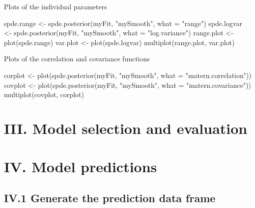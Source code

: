 \documentclass[
]{article}
\newenvironment{Shaded}{\begin{snugshade}}{\end{snugshade}}
\newcommand{\AttributeTok}[1]{\textcolor[rgb]{0.77,0.63,0.00}{#1}}
\newcommand{\FunctionTok}[1]{\textcolor[rgb]{0.00,0.00,0.00}{#1}}
\newcommand{\NormalTok}[1]{#1}
\newcommand{\OtherTok}[1]{\textcolor[rgb]{0.56,0.35,0.01}{#1}}
\newcommand{\StringTok}[1]{\textcolor[rgb]{0.31,0.60,0.02}{#1}}
\begin{document}
Plots of the individual parameters

\begin{Shaded}
\begin{Highlighting}[]
\NormalTok{spde.range }\OtherTok{\textless{}{-}} \FunctionTok{spde.posterior}\NormalTok{(myFit, }\StringTok{"mySmooth"}\NormalTok{, }\AttributeTok{what =} \StringTok{"range"}\NormalTok{)}
\NormalTok{spde.logvar }\OtherTok{\textless{}{-}} \FunctionTok{spde.posterior}\NormalTok{(myFit, }\StringTok{"mySmooth"}\NormalTok{, }\AttributeTok{what =} \StringTok{"log.variance"}\NormalTok{)}
\NormalTok{range.plot }\OtherTok{\textless{}{-}} \FunctionTok{plot}\NormalTok{(spde.range)}
\NormalTok{var.plot }\OtherTok{\textless{}{-}} \FunctionTok{plot}\NormalTok{(spde.logvar)}
\FunctionTok{multiplot}\NormalTok{(range.plot, var.plot)}
\end{Highlighting}
\end{Shaded}

Plots of the correlation and covariance functions

\begin{Shaded}
\begin{Highlighting}[]
\NormalTok{corplot }\OtherTok{\textless{}{-}} \FunctionTok{plot}\NormalTok{(}\FunctionTok{spde.posterior}\NormalTok{(myFit, }\StringTok{"mySmooth"}\NormalTok{, }\AttributeTok{what =} \StringTok{"matern.correlation"}\NormalTok{))}
\NormalTok{covplot }\OtherTok{\textless{}{-}} \FunctionTok{plot}\NormalTok{(}\FunctionTok{spde.posterior}\NormalTok{(myFit, }\StringTok{"mySmooth"}\NormalTok{, }\AttributeTok{what =} \StringTok{"matern.covariance"}\NormalTok{))}
\FunctionTok{multiplot}\NormalTok{(covplot, corplot)}
\end{Highlighting}
\end{Shaded}

\hypertarget{iii.-model-selection-and-evaluation}{%
\section{III. Model selection and
evaluation}\label{iii.-model-selection-and-evaluation}}

\hypertarget{iv.-model-predictions}{%
\section{IV. Model predictions}\label{iv.-model-predictions}}

\hypertarget{iv.1-generate-the-prediction-data-frame}{%
\subsection{IV.1 Generate the prediction data
frame}\label{iv.1-generate-the-prediction-data-frame}}
\end{document}
